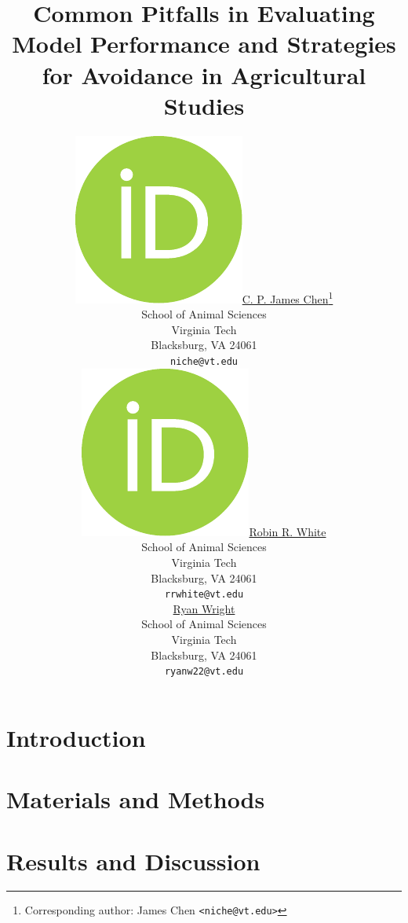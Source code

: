 \documentclass{article}
\title{Common Pitfalls in Evaluating Model Performance and Strategies for Avoidance in Agricultural Studies}
\author{
	\href{https://orcid.org/0000-0002-2018-0702}{\includegraphics[scale=0.06]{orcid.pdf}\hspace{1mm}C. P. James Chen}\thanks{Corresponding author: James Chen \texttt{<niche@vt.edu>}}\\
	School of Animal Sciences\\
	Virginia Tech\\
	Blacksburg, VA 24061 \\
	\texttt{niche@vt.edu} \\
    \And
	\href{https://orcid.org/0000-0001-5713-012X}{\includegraphics[scale=0.06]{orcid.pdf}\hspace{1mm}Robin R. White} \\
	School of Animal Sciences\\
	Virginia Tech\\
	Blacksburg, VA 24061 \\
	\texttt{rrwhite@vt.edu} \\
    \And
	\href{}{\hspace{1mm}Ryan Wright} \\
	School of Animal Sciences\\
	Virginia Tech\\
	Blacksburg, VA 24061 \\
	\texttt{ryanw22@vt.edu}
}
\numberwithin{equation}{section}
\begin{document}
\maketitle



\newpage
\section{Introduction}




\newpage
\section{Materials and Methods}







\newpage
\section{Results and Discussion}





\newpage



\newpage



\newpage

\renewcommand{\theequation}{S.\arabic{equation}}
\renewcommand{\thefigure}{S.\arabic{figure}}
\renewcommand{\thetable}{S.\arabic{table}}


\end{document}
